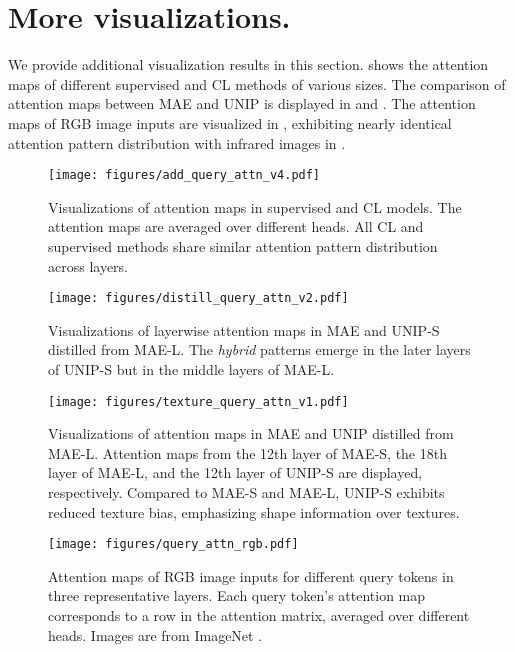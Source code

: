 \section{More visualizations.}
\label{app:more_visualization}

We provide additional visualization results in this section.  shows the attention maps of different supervised and CL methods of various sizes. The comparison of attention maps between MAE and UNIP is displayed in  and . The attention maps of RGB image inputs are visualized in , exhibiting nearly identical attention pattern distribution with infrared images in .


\begin{figure}[ht]
\centering
\texttt{[image: figures/add\_query\_attn\_v4.pdf]}
\vspace{-22pt}
\caption{Visualizations of attention maps in supervised and CL models. The attention maps are averaged over different heads. All CL and supervised methods share similar attention pattern distribution across layers.}
\label{fig:query_attn_cl}
\end{figure}

\begin{figure}[ht]
\centering
\texttt{[image: figures/distill\_query\_attn\_v2.pdf]}
\vspace{-22pt}
\caption{Visualizations of layerwise attention maps in MAE and UNIP-S distilled from MAE-L. The \textit{hybrid} patterns emerge in the later layers of UNIP-S but in the middle layers of MAE-L.}
\label{fig:distill_query_attn}
\end{figure}


\begin{figure}[ht]
\centering
\texttt{[image: figures/texture\_query\_attn\_v1.pdf]}
\vspace{-22pt}
\caption{Visualizations of attention maps in MAE and UNIP distilled from MAE-L. Attention maps from the 12th layer of MAE-S, the 18th layer of MAE-L, and the 12th layer of UNIP-S are displayed, respectively. Compared to MAE-S and MAE-L, UNIP-S exhibits reduced texture bias, emphasizing shape information over textures.}
\label{fig:texture_query_attn}
\vspace{-15pt}
\end{figure}


\begin{figure}[t]
\centering
\texttt{[image: figures/query\_attn\_rgb.pdf]}
\vspace{-24pt}
\caption{Attention maps of RGB image inputs for different query tokens in three representative layers. Each query token's attention map corresponds to a row in the attention matrix, averaged over different heads. Images are from ImageNet \citep{imagenet}.}
\label{fig:query_attn_rgb}
\vspace{-14pt}
\end{figure}
